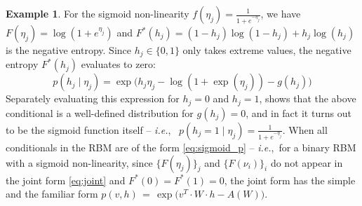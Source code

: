 \documentclass[twoside]{article}
\theoremstyle{plain}
\theoremstyle{definition}
\newtheorem{example}{Example}[section]
\theoremstyle{remark}
\newcommand{\ie}[0]{\emph{i.e.},~}
\newcommand{\refEq}[1]{\cref{#1}}%
\newcommand{\boldit}[1]{\ensuremath{#1}}
\newcommand{\sfit}[1]{\ensuremath{#1}}
\newcommand{\xx}[0]{\ensuremath{\boldit{v}}}%
\newcommand{\yy}[0]{\ensuremath{\boldit{h}}}%
\newcommand{\y}[0]{\ensuremath{{h}}}%
\newcommand{\WW}[0]{\ensuremath{\boldit{W}}}%
\newcommand{\pp}[0]{\ensuremath{\sfit{p}}}%
\newcommand{\ff}[0]{\ensuremath{\sfit{f}}}%
\newcommand{\FF}[0]{\ensuremath{\sfit{F}}}%
\newcommand{\ZZ}[0]{\ensuremath{\sfit{A}}}%
\newcommand{\gh}[0]{\ensuremath{\sfit{g}}}%
\begin{document}
\begin{mdframed}[style=MyFrame]
\begin{example}
  For the sigmoid non-linearity $\ff(\eta_j) = \frac{1}{1 + e^{-\eta_j}}$, 
  we have $\FF(\eta_j) = \log(1 + e^{\eta_j})$ and $\FF^*(\y_j) = (1 - \y_j)\log(1 - \y_j) + \y_j \log(\y_j)$ is the negative entropy.
  Since $\y_j \in \{0, 1\}$ only takes extreme values, the negative entropy  $\FF^*(\y_j)$ evaluates to zero: 
\begin{equation}\label{eq:sigmoid_p}
\pp(\y_j \mid \eta_j) = \exp \bigg ( \y_j \eta_j - \log(1 + \exp(\eta_j)) - \gh(\y_j)\bigg)
\end{equation}
  Separately evaluating this expression for $\y_j = 0$ and $\y_j = 1$, shows that the above conditional is a well-defined distribution for $\gh(\y_j) = 0$, and in 
fact it turns out to be the sigmoid function itself -- \ie 
  $\pp(\y_j = 1 \mid \eta_j) = \frac{1}{1 + e^{-\eta_j}}$. 
  When all conditionals in the RBM are of the form \refEq{eq:sigmoid_p} -- \ie for a binary RBM with a sigmoid non-linearity, since $\{\FF(\eta_j)\}_j$ and $\{\FF(\nu_i)\}_i$ do not appear in the joint form \refEq{eq:joint} and $\FF^*(0) = \FF^*(1) = 0$, the joint form has the simple and the familiar form 
  $
  \pp(\xx, \yy) \, = \, \exp \big ( \xx^T \cdot \WW \cdot \yy  - \ZZ(\WW) \big )
  $.
\end{example}
\end{mdframed}
\end{document}
